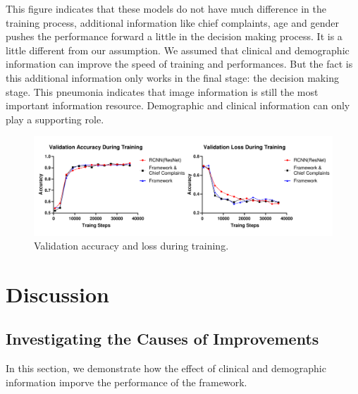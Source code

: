 \documentclass[journal]{IEEEtran}
\begin{document}
This figure indicates that these models do not have much difference in the training process, additional information like chief complaints, age and gender pushes the performance forward a little in the decision making process. It is a little different from our assumption. We assumed that clinical and demographic information can improve the speed of training and performances. But the fact is this additional information only works in the final stage: the decision making stage. This pneumonia indicates that image information is still the most important information resource. Demographic and clinical information can only play a supporting role.

\begin{figure}[htbp]
    \centerline{\includegraphics[width=180mm]{aacloss2.pdf}}
    \vspace{-0.5cm}
    \caption{Validation accuracy and loss during training.}
    \vspace{-0cm}
    \label{loss}

    \end{figure}

\section{Discussion}
\label{discussion}

\subsection{Investigating the Causes of Improvements}
In this section, we demonstrate how the effect of clinical and demographic information imporve the performance of the framework.
\end{document}
